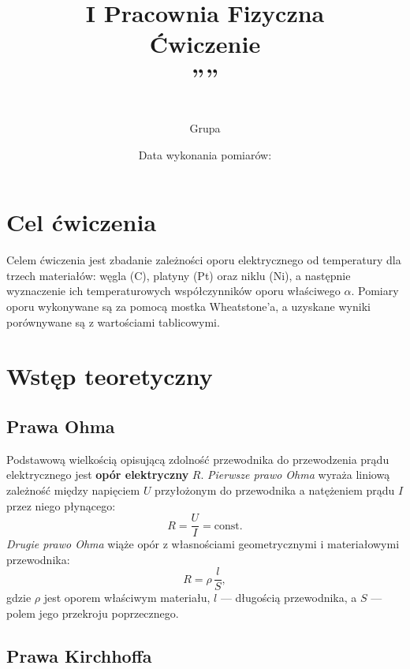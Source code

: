 \documentclass[12pt, a4paper]{article}
\title{
    \large I Pracownia Fizyczna \\[0.5em]
    \textbf{Ćwiczenie \nrCwiczenia} \\[0.3em]
    \LARGE \tytul\space''\codeword''
}
\author{
    \autor\\
     Grupa \nrGrupy}
\date{
    Data wykonania pomiarów: \dataWykonania\\
}
\begin{document}

\maketitle
\thispagestyle{empty}
\newpage

\section{Cel ćwiczenia}

Celem ćwiczenia jest zbadanie zależności oporu elektrycznego od temperatury dla trzech materiałów:
węgla (C), platyny (Pt) oraz niklu (Ni), a następnie wyznaczenie ich temperaturowych współczynników
oporu właściwego $\alpha$. Pomiary oporu wykonywane są za pomocą mostka Wheatstone'a, a uzyskane
wyniki porównywane są z wartościami tablicowymi.

\section{Wstęp teoretyczny}

\subsection{Prawa Ohma}

Podstawową wielkością opisującą zdolność przewodnika do przewodzenia prądu elektrycznego jest
\textbf{opór elektryczny} $R$. \textit{Pierwsze prawo Ohma} wyraża liniową zależność między napięciem $U$
przyłożonym do przewodnika a natężeniem prądu $I$ przez niego płynącego:
\begin{equation}
    R = \frac{U}{I} = \text{const}.
    \label{eq:ohm1}
\end{equation}
\textit{Drugie prawo Ohma} wiąże opór z własnościami geometrycznymi i materiałowymi przewodnika:
\begin{equation}
    R = \rho\,\frac{l}{S},
    \label{eq:ohm2}
\end{equation}
gdzie $\rho$ jest oporem właściwym materiału, $l$ --- długością przewodnika, a $S$ --- polem jego przekroju
poprzecznego.

\subsection{Prawa Kirchhoffa}
\end{document}
